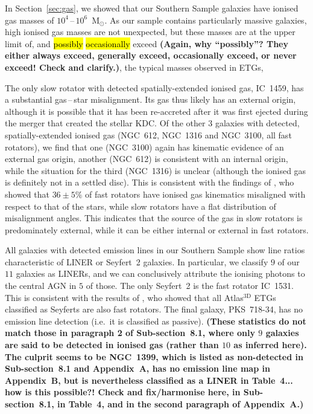 \documentclass[a4paper,fleqn,usenatbib]{mnras}
\DeclareRobustCommand{\removed}[1]{{\sethlcolor{red}\hl{#1}}}
\DeclareRobustCommand{\added}[1]{{\sethlcolor{green}\hl{#1}}}
\begin{document}
In Section~\ref{sec:gas}, we showed that our Southern Sample galaxies
have ionised gas masses of $10^4$\,--\,$10^6$~$\mathrm{M_\odot}$. As
our sample contains particularly massive galaxies, high ionised gas
masses are not unexpected, but these masses are at the upper limit of,
and \removed{possibly} \added{occasionally} exceed {\bf (Again, why ``possibly''? They either always
  exceed, generally exceed, occasionally exceed, or never exceed!
  Check and clarify.)}, the typical masses observed in ETGs,

The only slow rotator with detected spatially-extended ionised gas,
IC~1459, has a substantial gas\,--\,star misalignment. Its gas thus
likely has an external origin, although it is possible that it has
been re-accreted after it was first ejected during the merger that
created the stellar KDC. Of the other $3$ galaxies with detected,
spatially-extended ionised gas (NGC~612, NGC~1316 and NGC~3100, all
fast rotators), we find that one (NGC~3100) again has kinematic
evidence of an external gas origin, another (NGC~612) is consistent
with an internal origin, while the situation for the third (NGC~1316)
is unclear (although the ionised gas is definitely not in a settled
disc). This is consistent with the findings of \citet{Davis2011a}, who
showed that $36\pm5\%$ of fast rotators have ionised gas kinematics
misaligned with respect to that of the stars, while slow rotators have
a flat distribution of misalignment angles. This indicates that the
source of the gas in slow rotators is predominately external, while it
can be either internal or external in fast rotators.

All galaxies with detected emission lines in our Southern Sample show
line ratios characteristic of LINER or Seyfert~2 galaxies. In
particular, we classify $9$ of our $11$ galaxies as LINERs, and we can
conclusively attribute the ionising photons to the central AGN in $5$
of those. The only Seyfert~2 is the fast rotator IC~1531. This is
consistent with the results of \citet{Nyland2016}, who showed that all
Atlas$^\text{3D}$ ETGs classified as Seyferts are also fast rotators.
The final galaxy, PKS~718-34, has no emission line detection (i.e.\ it
is classified as passive). {\bf (These statistics do not match those
  in paragraph 2 of Sub-section~8.1, where only $9$ galaxies are said
  to be detected in ionised gas (rather than $10$ as inferred
  here). The culprit seems to be NGC~1399, which is listed as
  non-detected in Sub-section~8.1 and Appendix~A, has no emission line
  map in Appendix~B, but is nevertheless classified as a LINER in
  Table~4... how is this possible?! Check and fix/harmonise here, in
  Sub-section~8.1, in Table~4, and in the second paragraph of
  Appendix~A.)}
\end{document}
